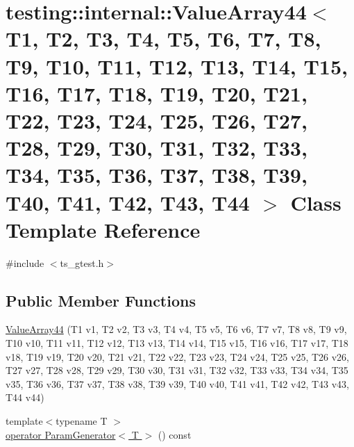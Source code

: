 \hypertarget{classtesting_1_1internal_1_1ValueArray44}{\section{testing\-:\-:internal\-:\-:Value\-Array44$<$ T1, T2, T3, T4, T5, T6, T7, T8, T9, T10, T11, T12, T13, T14, T15, T16, T17, T18, T19, T20, T21, T22, T23, T24, T25, T26, T27, T28, T29, T30, T31, T32, T33, T34, T35, T36, T37, T38, T39, T40, T41, T42, T43, T44 $>$ Class Template Reference}
\label{classtesting_1_1internal_1_1ValueArray44}
}


{\ttfamily \#include $<$ts\-\_\-gtest.\-h$>$}

\subsection*{Public Member Functions}
\begin{DoxyCompactItemize}
\item 
\hyperlink{classtesting_1_1internal_1_1ValueArray44_ab9d24377be591647140614dc44c22521}{Value\-Array44} (T1 v1, T2 v2, T3 v3, T4 v4, T5 v5, T6 v6, T7 v7, T8 v8, T9 v9, T10 v10, T11 v11, T12 v12, T13 v13, T14 v14, T15 v15, T16 v16, T17 v17, T18 v18, T19 v19, T20 v20, T21 v21, T22 v22, T23 v23, T24 v24, T25 v25, T26 v26, T27 v27, T28 v28, T29 v29, T30 v30, T31 v31, T32 v32, T33 v33, T34 v34, T35 v35, T36 v36, T37 v37, T38 v38, T39 v39, T40 v40, T41 v41, T42 v42, T43 v43, T44 v44)
\item 
{\footnotesize template$<$typename T $>$ }\\\hyperlink{classtesting_1_1internal_1_1ValueArray44_af1b61d6c661653fa3be82c8c356a2ee2}{operator Param\-Generator$<$ T $>$} () const 
\end{DoxyCompactItemize}


